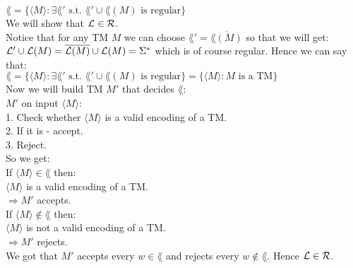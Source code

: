 $\lang = \{\langle M \rangle : \exists \lang' \text { s.t. } \lang' \cup \lang(M) \text{ is regular}\}$ \\

We will show that $\mathcal{L} \in \mathcal{R}$. \\

Notice that for any TM $M$ we can choose $\lang' = \overline{\lang(M)}$ so that we will get: \\
$\mathcal{L}' \cup \mathcal{L}(M) =  \overline{\mathcal{L}(M)} \cup \mathcal{L}(M) = \Sigma^*$ which is of course regular.
Hence we can say that: \\
$\lang = \{\langle M \rangle : \exists \lang' \text { s.t. } \lang' \cup \lang(M) \text{ is regular}\}
    = \{\langle M \rangle : M \text{ is a TM}\}$ \\

Now we will build TM $M'$ that decides $\lang$: \\
$M'$ on input $\langle M \rangle$: \\
1. Check whether $\langle M \rangle$ is a valid encoding of a TM. \\
2. If it is - accept. \\
3. Reject. \\

So we get: \\
If $\langle M \rangle \in \lang$ then: \\
$\langle M \rangle$ is a valid encoding of a TM. \\
$\Longrightarrow M'$ accepts. \\

If $\langle M \rangle \notin \lang$ then: \\
$\langle M \rangle$ is not a valid encoding of a TM. \\
$\Longrightarrow M'$ rejects. \\

We got that $M'$ accepts every $w \in \lang$ and rejects every $w \notin \lang$. Hence $\mathcal{L} \in \mathcal{R}$. \\
